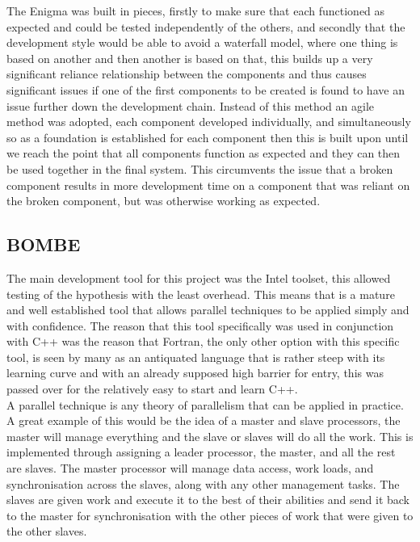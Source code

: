 \documentclass[12pt,a4paper]{article}
\begin{document}
The Enigma was built in pieces, firstly to make sure that each functioned as expected and could be tested independently of the others, and secondly that the development style would be able to avoid a waterfall model, where one thing is based on another and then another is based on that, this builds up a very significant reliance relationship between the components and thus causes significant issues if one of the first components to be created is found to have an issue further down the development chain. Instead of this method an agile method was adopted, each component developed individually, and simultaneously so as a foundation is established for each component then this is built upon until we reach the point that all components function as expected and they can then be used together in the final system. This circumvents the issue that a broken component results in more development time on a component that was reliant on the broken component, but was otherwise working as expected.

\subsection{BOMBE}

The main development tool for this project was the Intel toolset, this allowed testing of the hypothesis with the least overhead. This means that is a mature and well established tool that allows parallel techniques to be applied simply and with confidence. The reason that this tool specifically was used in conjunction with C++ was the reason that Fortran, the only other option with this specific tool, is seen by many as an antiquated language that is rather steep with its learning curve and with an already supposed high barrier for entry, this was passed over for the relatively easy to start and learn C++.\\

A parallel technique is any theory of parallelism that can be applied in practice. A great example of this would be the idea of a master and slave processors, the master will manage everything and the slave or slaves will do all the work. This is implemented through assigning a leader processor, the master, and all the rest are slaves. The master processor will manage data access, work loads, and synchronisation across the slaves, along with any other management tasks. The slaves are given work and execute it to the best of their abilities and send it back to the master for synchronisation with the other pieces of work that were given to the other slaves.
\end{document}
